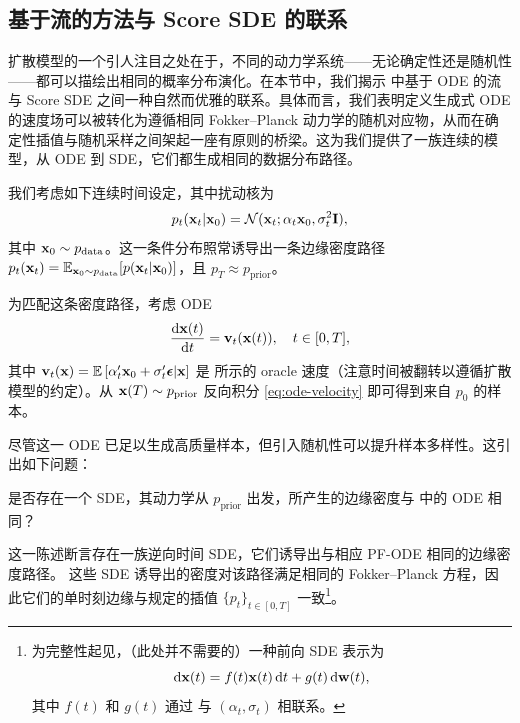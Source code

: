 \subsection{基于流的方法与 Score SDE 的联系}\label{subsec:flow-score}

扩散模型的一个引人注目之处在于，不同的动力学系统——无论确定性还是随机性——都可以描绘出相同的概率分布演化。在本节中，我们揭示  中基于 ODE 的流与 Score SDE 之间一种自然而优雅的联系。具体而言，我们表明定义生成式 ODE 的速度场可以被转化为遵循相同 Fokker–Planck 动力学的随机对应物，从而在确定性插值与随机采样之间架起一座有原则的桥梁。这为我们提供了一族连续的模型，从 ODE 到 SDE，它们都生成相同的数据分布路径。

我们考虑如下连续时间设定，其中扰动核为
\[
p_t({\mathbf{x}}_t|{\mathbf{x}}_0) = \mathcal{N}({\mathbf{x}}_t; \alpha_t {\mathbf{x}}_0, \sigma_t^2 {\mathbf{I}}),
\]
其中 ${\mathbf{x}}_0 \sim p_{\mathrm{data}}$。这一条件分布照常诱导出一条边缘密度路径 $p_t({\mathbf{x}}_t) = \mathbb{E}_{{\mathbf{x}}_0 \sim p_{\mathrm{data}}}[p({\mathbf{x}}_t|{\mathbf{x}}_0)]$，且 $p_T\approx p_{\mathrm{prior}}$。

为匹配这条密度路径，考虑 ODE
\begin{align}\label{eq:ode-velocity}
    \frac{\mathop{}\!\mathrm{d}{\mathbf{x}}(t)}{\mathop{}\!\mathrm{d} t} = \mathbf{v}_t({\mathbf{x}}(t)), \quad t \in [0,T],
\end{align}
其中 $\mathbf{v}_t({\mathbf{x}}) =\mathbb{E}\left[\alpha_t'{\mathbf{x}}_0+\sigma_t'{\bm{\epsilon}}|{\mathbf{x}}\right]$ 是  所示的 oracle 速度（注意时间被翻转以遵循扩散模型的约定）。从 ${\mathbf{x}}(T)\sim p_{\mathrm{prior}}$ 反向积分 \eqref{eq:ode-velocity} 即可得到来自 $p_0$ 的样本。

尽管这一 ODE 已足以生成高质量样本，但引入随机性可以提升样本多样性。这引出如下问题：
\begin{question}
是否存在一个 SDE，其动力学从 $p_{\mathrm{prior}}$ 出发，所产生的边缘密度与  中的 ODE 相同？
\end{question}
这一陈述断言存在一族逆向时间 SDE，它们诱导出与相应 PF-ODE 相同的边缘密度路径。
这些 SDE 诱导出的密度对该路径满足相同的 Fokker–Planck 方程，因此它们的单时刻边缘与规定的插值 $\{p_t\}_{t\in[0,T]}$ 一致\footnote{为完整性起见，（此处并不需要的）一种前向 SDE 表示为
\[
\mathop{}\!\mathrm{d} {\mathbf{x}}(t)=f(t) {\mathbf{x}}(t) \mathop{}\!\mathrm{d} t+g(t) \mathop{}\!\mathrm{d} {\mathbf{w}}(t),
\]
其中 $f(t)$ 和 $g(t)$ 通过  与 $(\alpha_t,\sigma_t)$ 相联系。}。


